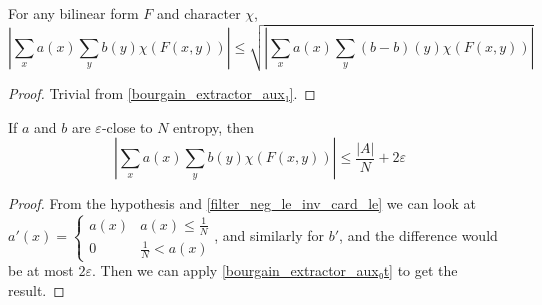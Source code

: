\begin{theorem}
    \label{bourgain_extractor_aux₁t}
    \leanok
    For any bilinear form $F$ and character $\chi$,
    $$|\sum_x{a(x) \sum_y{b(y) \chi(F(x, y))}}| \leq \sqrt{|\sum_x{a(x) \sum_y{(b-b)(y) \chi(F(x, y))}}|}$$
\end{theorem}

\begin{proof}
    \leanok
    Trivial from \ref{bourgain_extractor_aux₁}.
\end{proof}

\begin{theorem}
    \label{bourgain_extractor_aux₂}
    \leanok
    If $a$ and $b$ are $\varepsilon$-close to $N$ entropy,
    then 
    $$|\sum_x{a(x) \sum_y{b(y) \chi(F(x, y))}}| \leq \frac{|A|}N + 2\varepsilon$$
\end{theorem}

\begin{proof}
    \leanok
    From the hypothesis and \ref{filter_neg_le_inv_card_le} we can look at $a'(x) = \begin{cases}a(x) & a(x) \leq \frac1N \\ 0 & \frac1N < a(x)\end{cases}$, and similarly
    for $b'$, and the difference would be at most $2 \varepsilon$. Then we can apply \ref{bourgain_extractor_aux₀t} to get the result.
\end{proof}

